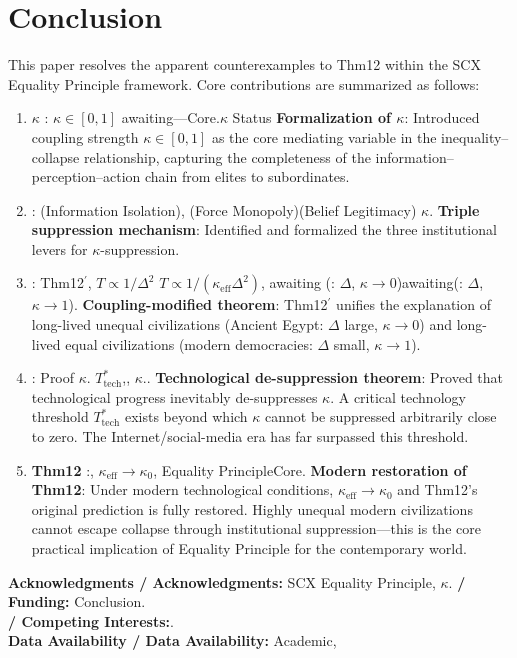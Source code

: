 \documentclass[11pt,a4paper]{article}
\theoremstyle{definition}
\newcommand{\eqtheory}{Equality Principle}
\newcommand{\coupling}{\kappa}
\begin{document}
\section{Conclusion}
This paper resolves the apparent counterexamples to Thm12 within the SCX \eqtheory{}
framework. Core contributions are summarized as follows:
\begin{enumerate}
 \item \textbf{$\coupling$ }: $\coupling \in [0,1]$ 
 awaiting---Core.$\coupling$ Status
 \textbf{Formalization of $\coupling$}: Introduced coupling strength
 $\coupling \in [0,1]$ as the core mediating variable in the
 inequality--collapse relationship, capturing the completeness of the
 information--perception--action chain from elites to subordinates.
 \item : (Information Isolation), 
 (Force Monopoly)(Belief Legitimacy)
 $\coupling$.
 \textbf{Triple suppression mechanism}: Identified and formalized the three
 institutional levers for $\coupling$-suppression.
 \item : Thm12$^\prime$, $T \propto 1/\Delta^2$
 $T \propto 1/(\coupling_{\text{eff}} \Delta^2)$, awaiting
 (: $\Delta$, $\coupling \to 0$)awaiting(: 
 $\Delta$, $\coupling \to 1$).
 \textbf{Coupling-modified theorem}: Thm12$^\prime$ unifies the explanation of
 long-lived unequal civilizations (Ancient Egypt: $\Delta$ large, $\coupling \to 0$)
 and long-lived equal civilizations (modern democracies: $\Delta$ small,
 $\coupling \to 1$).
 \item : Proof $\coupling$.
 $T_{\text{tech}}^*$,, 
 $\coupling$..
 \textbf{Technological de-suppression theorem}: Proved that technological
 progress inevitably de-suppresses $\coupling$. A critical technology threshold
 $T_{\text{tech}}^*$ exists beyond which $\coupling$ cannot be suppressed
 arbitrarily close to zero. The Internet/social-media era has far surpassed this threshold.
 \item \textbf{Thm12 }:, $\coupling_{\text{eff}} \to \coupling_0$, 
 Equality PrincipleCore.
 \textbf{Modern restoration of Thm12}: Under modern technological conditions,
 $\coupling_{\text{eff}} \to \coupling_0$ and Thm12's original prediction is
 fully restored. Highly unequal modern civilizations cannot escape collapse
 through institutional suppression---this is the core practical implication of
 \eqtheory{} for the contemporary world.
\end{enumerate}
\vspace{0.5cm}
\noindent
\textbf{Acknowledgments / Acknowledgments:} SCX Equality Principle, 
$\coupling$.
\vspace{0.5cm}
\noindent
\textbf{ / Funding:} Conclusion.\\
\textbf{ / Competing Interests:}.\\
\textbf{Data Availability / Data Availability:} Academic, 
\newpage
\appendix
\end{document}
